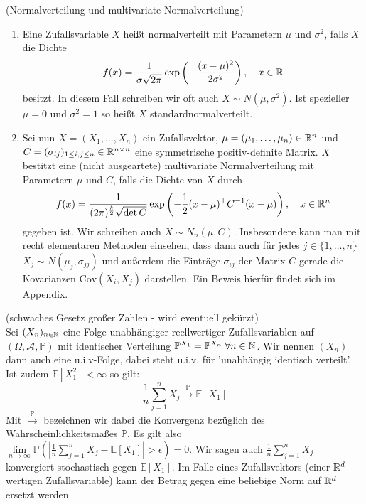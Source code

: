 \begin{Definition}(Normalverteilung und multivariate Normalverteilung)
	\label{normalvert}
	\begin{enumerate}[label=(\alph*)]
		\item Eine Zufallsvariable $ X $ heißt normalverteilt mit Parametern $ \mu $ und $ \sigma^2 $, falls $ X $ die Dichte 
		\[
			f(x) = \frac{1}{\sigma \sqrt{2 \pi}} \exp\left(-\frac{(x-\mu)^2}{2\sigma^2}\right), \quad x \in \mathbb{R} 
		\]
		besitzt. In diesem Fall schreiben wir oft auch $ X \sim N(\mu,\sigma^2) $. Ist spezieller $ \mu = 0 $ und $ \sigma^2 =1$ so heißt $ X $ standardnormalverteilt.
		\item Sei nun $ X = (X_1,\dots,X_n) $ ein Zufallsvektor, $ \mu =(\mu_1,\dots,\mu_n) \in \mathbb{R}^n $ und $ C = (\sigma_{ij})_{1 \leq i,j \leq n} \in \mathbb{R}^{n \times n} $ eine symmetrische positiv-definite Matrix.
		$ X $ bestitzt eine (nicht ausgeartete) multivariate Normalverteilung mit Parametern $ \mu $ und $ C $, falls die Dichte von $ X $ durch 
		\[
			f(x) = \frac{1}{(2\pi)^{\frac{k}{2}}\sqrt{\det C}}\exp\left(-\frac{1}{2}(x-\mu)^{\top}C^{-1}(x-\mu)  \right), \quad x\in \mathbb{R}^n
		\]
		gegeben ist. Wir schreiben auch $ X \sim N_n(\mu,C)  $.
		Insbesondere kann man mit recht elementaren Methoden einsehen, dass dann auch für jedes $ j \in \{ 1,\dots,n\} $ $ X_j \sim N(\mu_j,\sigma_{jj}) $ und außerdem die Einträge $ \sigma_{ij} $ der Matrix $ C $ gerade die Kovarianzen $ \text{Cov}(X_i,X_j) $ darstellen. Ein Beweis hierfür findet sich im Appendix.
		
	\end{enumerate}
\end{Definition}
\begin{Satz}(schwaches Gesetz großer Zahlen - wird eventuell gekürzt) \\
	Sei $ (X_n)_{n \in \mathbb{N} } $ eine Folge unabhängiger reellwertiger Zufallsvariablen auf $ (\Omega,\mathcal{A},\mathbb{P}) $ mit identischer Verteilung $ \mathbb{P}^{X_1} = \mathbb{P}^{X_n} \; \forall n \in \mathbb{N}$. Wir nennen $ (X_n) $ dann auch eine u.i.v-Folge, dabei steht u.i.v. für 'unabhängig identisch verteilt'.
	Ist zudem $ \mathbb{E}[X_1^2] < \infty $ so gilt:
	\[
		\frac{1}{n} \sum_{j=1}^n X_j \stackrel{\mathbb{P}}{\to} \mathbb{E}[X_1]
	\]
	Mit $ \stackrel{\mathbb{P}}{\to} $ bezeichnen wir dabei die Konvergenz bezüglich des Wahrscheinlichkeitsmaßes $ \mathbb{P} $. Es gilt also 
	$ \lim\limits_{n \to \infty} \mathbb{P}(|\frac{1}{n} \sum\limits_{j=1}^n X_j - \mathbb{E}[X_1]|>\epsilon) = 0 $. Wir sagen auch $ \frac{1}{n} \sum\limits_{j=1}^n X_j $ konvergiert stochastisch gegen $ \mathbb{E}[X_1] $. Im Falle eines Zufallsvektors (einer $ \mathbb{R}^d $-wertigen Zufallsvariable) kann der Betrag gegen eine beliebige Norm auf $ \mathbb{R}^d $ ersetzt werden.
\end{Satz}


